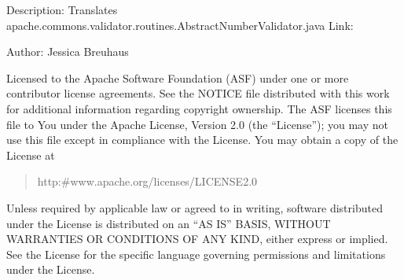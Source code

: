 \documentclass[letterpaper,10pt,english]{sphinxmanual}
\begin{document}
\sphinxAtStartPar
Description: Translates apache.commons.validator.routines.AbstractNumberValidator.java
Link: 

\sphinxAtStartPar
Author: Jessica Breuhaus
\begin{description}
\sphinxAtStartPar
Licensed to the Apache Software Foundation (ASF) under one or more
contributor license agreements.  See the NOTICE file distributed with
this work for additional information regarding copyright ownership.
The ASF licenses this file to You under the Apache License, Version 2.0
(the “License”); you may not use this file except in compliance with
the License.  You may obtain a copy of the License at
\begin{quote}

\sphinxAtStartPar
http:\#www.apache.org/licenses/LICENSE\sphinxhyphen{}2.0
\end{quote}

\sphinxAtStartPar
Unless required by applicable law or agreed to in writing, software
distributed under the License is distributed on an “AS IS” BASIS,
WITHOUT WARRANTIES OR CONDITIONS OF ANY KIND, either express or implied.
See the License for the specific language governing permissions and
limitations under the License.

\end{description}
\end{document}

